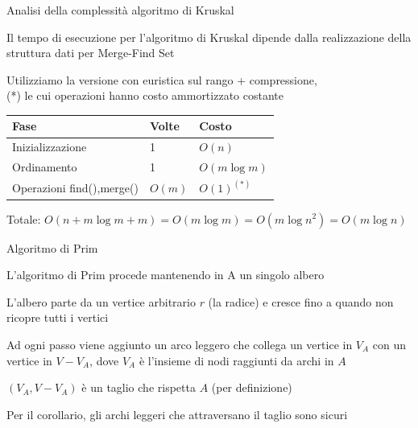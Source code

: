 \begin{frame}{Analisi della complessità algoritmo di Kruskal}

\BIL
\item Il tempo di esecuzione per l’algoritmo di Kruskal dipende dalla realizzazione della struttura dati per Merge-Find Set
\item Utilizziamo la versione con \alert{euristica sul rango + compressione},\\ (*) le cui operazioni hanno costo ammortizzato costante 

\medskip
\begin{tabular}{|l|l|l|}
\hline
\textbf{Fase} & \textbf{Volte} & \textbf{Costo} \\\hline
Inizializzazione & 1 & $O(n)$ \\\hline
Ordinamento & 1 & $O(m \log m)$ \\\hline
Operazioni \textsf{find}(),\textsf{merge}() & $O(m)$ & $O(1)^{(*)}$ \\\hline
\end{tabular}
\item Totale:  $O(n + m \log m + m) = O(m \log m) = O(m \log n^2) = O(m \log n)$
\EIL
\end{frame}

\begin{frame}{Algoritmo di Prim}


\vspace{-9pt}
\begin{myboxtitle}[Idea]
\BIL
\item L’algoritmo di Prim procede mantenendo in A un singolo albero 
\item L’albero parte da un vertice arbitrario $r$ (la radice) e cresce fino a quando non ricopre tutti i vertici
\item Ad ogni passo viene aggiunto un arco leggero che collega un vertice in $V_A$ con un vertice in $V-V_A$,
dove $V_A$ è l'insieme di nodi raggiunti da archi in $A$
\EIL
\end{myboxtitle}

\begin{myboxtitle}[Correttezza]
\BIL
\item $(V_A,V-V_A)$ è un taglio che rispetta $A$ (per definizione)
\item Per il corollario, gli archi leggeri che attraversano il taglio sono sicuri
\EIL
\end{myboxtitle}

\end{frame}


